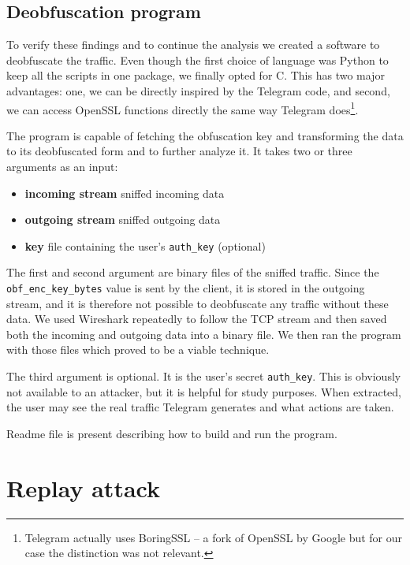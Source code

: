 \documentclass[thesis=M,english]{FITthesis}[2012/10/20]
\newcommand{\cpp}{C\nolinebreak\hspace{-.05em}\raisebox{.4ex}{\tiny +}\nolinebreak\hspace{-.10em}\raisebox{.4ex}{\tiny +}}
\begin{document}
\subsection{Deobfuscation program}\label{analysis-obf-program}

To verify these findings and to continue the analysis we created a software to deobfuscate the traffic. Even though the first choice of language was Python to keep all the scripts in one package, we finally opted for \cpp. This has two major advantages: one, we can be directly inspired by the Telegram code, and second, we can access OpenSSL functions directly the same way Telegram does\footnote{Telegram actually uses BoringSSL -- a fork of OpenSSL by Google but for our case the distinction was not relevant.}.

The program is capable of fetching the obfuscation key and transforming the data to its deobfuscated form and to further analyze it. It takes two or three arguments as an input:

\begin{itemize}

	\item \textbf{incoming stream} sniffed incoming data
	\item \textbf{outgoing stream} sniffed outgoing data
	\item \textbf{key} file containing the user's \texttt{auth\_key} (optional)

\end{itemize}

The first and second argument are binary files of the sniffed traffic. Since the \texttt{obf\_enc\_key\_bytes} value is sent by the client, it is stored in the outgoing stream, and it is therefore not possible to deobfuscate any traffic without these data. We used Wireshark repeatedly to follow the TCP stream and then saved both the incoming and outgoing data into a binary file. We then ran the program with those files which proved to be a viable technique.

The third argument is optional. It is the user's secret \texttt{auth\_key}. This is obviously not available to an attacker, but it is helpful for study purposes. When extracted, the user may see the real traffic Telegram generates and what actions are taken.

Readme file is present describing how to build and run the program.




\section{Replay attack}\label{analysis-attacks}
\end{document}
